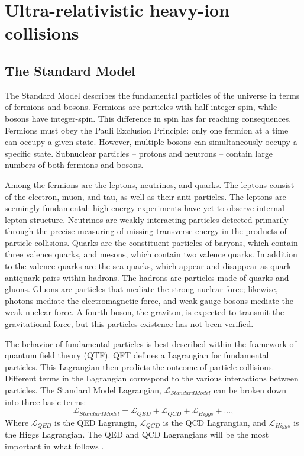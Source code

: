 \setlength\abovedisplayskip{0pt}

\chapter{Ultra-relativistic heavy-ion collisions}

\section{The Standard Model}

The Standard Model describes the fundamental particles of the universe in terms of fermions and bosons. Fermions are particles with half-integer spin, while bosons have integer-spin. This difference in spin has far reaching consequences. Fermions must obey the Pauli Exclusion Principle: only one fermion at a time can occupy a given state. However, multiple bosons can simultaneously occupy a specific state. Subnuclear particles -- protons and neutrons -- contain large numbers of both fermions and bosons. 

Among the fermions are the leptons, neutrinos, and quarks. The leptons consist of the electron, muon, and tau, as well as their anti-particles. The leptons are seemingly fundamental: high energy experiments have yet to observe internal lepton-structure. Neutrinos are weakly interacting particles detected primarily through the precise measuring of missing transverse energy in the products of particle collisions. Quarks are the constituent particles of baryons, which contain three valence quarks, and mesons, which contain two valence quarks. In addition to the valence quarks are the sea quarks, which appear and disappear as quark-antiquark pairs within hadrons. The hadrons are particles made of quarks and gluons. Gluons are particles that mediate the strong nuclear force; likewise, photons mediate the electromagnetic force, and weak-gauge bosons mediate the weak nuclear force. A fourth boson, the graviton, is expected to transmit the gravitational force, but this particles existence has not been verified. 

The behavior of fundamental particles is best described within the framework of quantum field theory (QTF). QFT defines a Lagrangian for fundamental particles. This Lagrangian then predicts the outcome of particle collisions. Different terms in the Lagrangian correspond to the various interactions between particles. The Standard Model Lagrangian, $\mathcal{L}_{Standard Model}$ can be broken down into three basic terms:	
\begin{equation}
\mathcal{L}_{Standard Model} = \mathcal{L}_{QED} + \mathcal{L}_{QCD} + \mathcal{L}_{Higgs} + ... ,  
\end{equation}
Where $\mathcal{L}_{QED}$ is the QED Lagrangin, $\mathcal{L}_{QCD}$ is the QCD Lagrangian, and $\mathcal{L}_{Higgs}$ is the Higgs Lagrangian. The QED and QCD Lagrangians will be the most important in what follows \cite{Halzen:1984mc}. 

